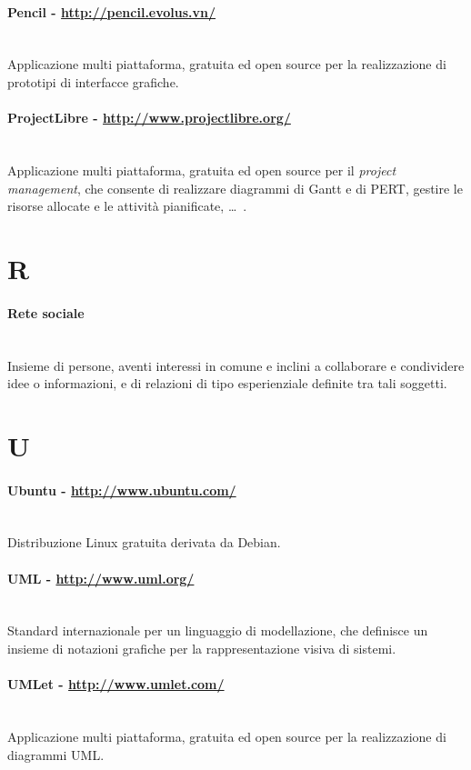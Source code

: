 \paragraph{Pencil - \url{http://pencil.evolus.vn/}} \hfill \\
Applicazione multi piattaforma, gratuita ed open source per la realizzazione di prototipi di interfacce grafiche.
\paragraph{ProjectLibre - \url{http://www.projectlibre.org/}} \hfill \\
Applicazione multi piattaforma, gratuita ed open source per il \textit{project management}, che consente di realizzare diagrammi di Gantt e di PERT, gestire le risorse allocate e le attività pianificate, \ldots\ .

\section*{R}
\paragraph{Rete sociale} \hfill \\
Insieme di persone, aventi interessi in comune e inclini a collaborare e condividere idee o informazioni, e di relazioni di tipo esperienziale definite tra tali soggetti.

\section*{U}
\paragraph{Ubuntu - \url{http://www.ubuntu.com/}} \hfill \\
Distribuzione Linux gratuita derivata da Debian.
\paragraph{UML - \url{http://www.uml.org/}} \hfill \\
Standard internazionale per un linguaggio di modellazione, che definisce un insieme di notazioni grafiche per la rappresentazione visiva di sistemi.
\paragraph{UMLet - \url{http://www.umlet.com/}} \hfill \\
Applicazione multi piattaforma, gratuita ed open source per la realizzazione di diagrammi UML.
